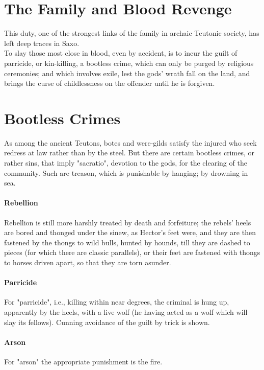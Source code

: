 \documentclass[10pt,a4paper]{report}
\begin{document}
\section{The Family and Blood Revenge}
This duty, one of the strongest links of the family in archaic Teutonic society, has left deep traces in Saxo.\\

To slay those most close in blood, even by accident, is to incur the guilt of parricide, or kin-killing, a bootless crime, which can only be purged by religious ceremonies; and which involves exile, lest the gods' wrath fall on the land, and brings the curse of childlessness on the offender until he is forgiven.\\

\section{Bootless Crimes}
As among the ancient Teutons, botes and were-gilds satisfy the injured who seek redress at law rather than by the steel. But there are certain bootless crimes, or rather sins, that imply "sacratio", devotion to the gods, for the clearing of the community. Such are treason, which is punishable by hanging; by drowning in sea.\\

\paragraph*{Rebellion}
Rebellion is still more harshly treated by death and forfeiture; the rebels' heels are bored and thonged under the sinew, as Hector's feet were, and they are then fastened by the thongs to wild bulls, hunted by hounds, till they are dashed to pieces (for which there are classic parallels), or their feet are fastened with thongs to horses driven apart, so that they are torn asunder.\\

\paragraph*{Parricide}
For "parricide", i.e., killing within near degrees, the criminal is hung up, apparently by the heels, with a live wolf (he having acted as a wolf which will slay its fellows). Cunning avoidance of the guilt by trick is shown.\\

\paragraph*{Arson}
For "arson" the appropriate punishment is the fire.\\
\end{document}
